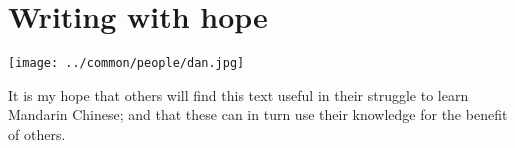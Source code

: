 \section*{Writing with hope}
\parbox{32mm}{%
  \texttt{[image: ../common/people/dan.jpg]}
  }%
\hfill%
\parbox{\tw-33mm}{%
  It is my hope that others will find this text useful in their struggle to learn Mandarin Chinese;
  and that these can in turn use their knowledge for the benefit of others.

  }



